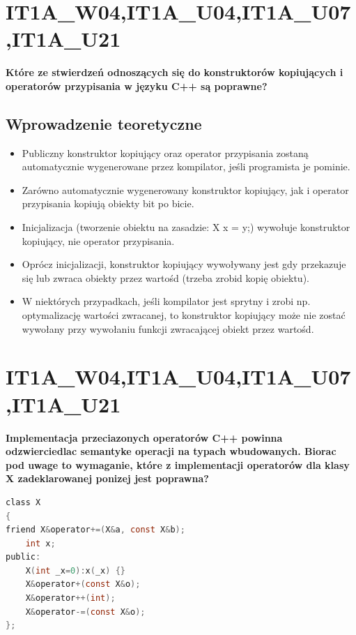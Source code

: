 \section{IT1A\_W04,IT1A\_U04,IT1A\_U07,IT1A\_U21}
\textbf{Które ze stwierdzeń odnoszących się do konstruktorów kopiujących i operatorów przypisania w języku C++ są poprawne?}

\subsection{Wprowadzenie teoretyczne}
\begin{itemize}
\item Publiczny konstruktor kopiujący oraz operator przypisania zostaną automatycznie wygenerowane przez kompilator, jeśli programista je pominie.
\item Zarówno automatycznie wygenerowany konstruktor kopiujący, jak i operator przypisania kopiują obiekty bit po bicie.
\item Inicjalizacja (tworzenie obiektu na zasadzie: X x = y;) wywołuje konstruktor kopiujący, nie operator przypisania.
\item Oprócz inicjalizacji, konstruktor kopiujący wywoływany jest gdy przekazuje się lub zwraca obiekty przez wartośd (trzeba zrobid kopię obiektu).
\item W niektórych przypadkach, jeśli kompilator jest sprytny i zrobi np. optymalizację wartości zwracanej, to konstruktor kopiujący może nie zostać wywołany przy wywołaniu funkcji zwracającej obiekt przez wartośd.
\end{itemize}


\section{IT1A\_W04,IT1A\_U04,IT1A\_U07,IT1A\_U21}
\textbf{Implementacja przeciazonych operatorów C++ powinna odzwierciedlac semantyke operacji na typach wbudowanych. Biorac pod uwage to wymaganie, które z implementacji operatorów dla klasy X zadeklarowanej ponizej jest poprawna? }
\begin{lstlisting}[language=c]
class X
{
friend X&operator+=(X&a, const X&b);
	int x;
public:
	X(int _x=0):x(_x) {}
	X&operator+(const X&o);
	X&operator++(int);
	X&operator-=(const X&o);
};
\end{lstlisting}

